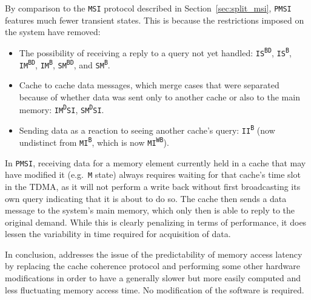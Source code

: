 By comparison to the \texttt{MSI} protocol described in
Section~\ref{sec:split_msi}, \texttt{PMSI} features much fewer transient states.
This is because the restrictions imposed on the system have removed:
\begin{itemize}
\item The possibility of receiving a reply to a query not yet handled:
\texttt{IS\textsuperscript{BD}}, \texttt{IS\textsuperscript{B}},
\texttt{IM\textsuperscript{BD}}, \texttt{IM\textsuperscript{B}},
\texttt{SM\textsuperscript{BD}}, and \texttt{SM\textsuperscript{B}}.
\item Cache to cache data messages, which merge cases that were separated
because of whether data was sent only to another cache or also to the main
memory:
\texttt{IM\textsuperscript{D}SI}, \texttt{SM\textsuperscript{D}SI}.
\item Sending data as a reaction to seeing another cache's query:
\texttt{II\textsuperscript{B}} (now undistinct from
\texttt{MI\textsuperscript{B}}, which is now \texttt{MI\textsuperscript{WB}}).
\end{itemize}
In \texttt{PMSI}, receiving data for a memory element currently held in a cache
that may have modified it (e.g.~\texttt{M} state) always requires waiting for
that cache's time slot in the TDMA, as it will not perform a write back without
first broadcasting its own query indicating that it is about to do so. The cache
then sends a data message to the system's main memory, which only then is able
to reply to the original demand. While this is clearly penalizing in terms of
performance, it does lessen the variability in time required for acquisition of
data.

In conclusion, \cite{conf/rtas/HassanKP17} addresses the issue of the
predictability of memory access latency by replacing the cache coherence
protocol and performing some other hardware modifications in order to have
a generally slower but more easily computed and less fluctuating memory
access time. No modification of the software is required.

\stopallthesefloats
